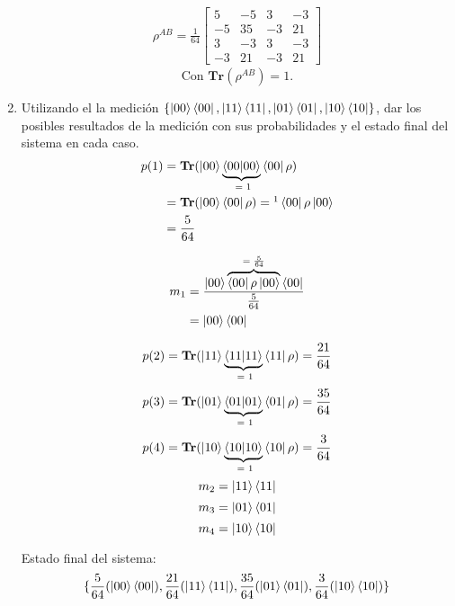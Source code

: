 \documentclass[a4paper]{article}
\begin{document}
\begin{enumerate}[label=(\alph*)]
\begin{align*}
\rho^{AB} = \frac{1}{64}
  \begin{bmatrix}
    5 & -5 & 3 & -3 \\
    -5 & 35 & -3 & 21 \\
    3 & -3 & 3 & -3 \\
    -3 & 21 & -3 & 21 
  \end{bmatrix}
\end{align*}
\[
\text{Con } \textbf{Tr}(\rho^{AB}) = 1.
\]
\newpage

\item{Utilizando el la medición $\{\ket{00}\bra{00}, \ket{11}\bra{11}, \ket{01}\bra{01}, \ket{10}\bra{10}\}$, dar los posibles resultados de la medición con sus probabilidades y el estado final del sistema en cada caso.}\\

\begin{align*}
p(1) &= \textbf{Tr}(\ket{00}\underbrace{\bra{00}\ket{00}}_{\text{ = 1}}\bra{00}\rho)\\
        &= \textbf{Tr}(\ket{00}\bra{00}\rho) =\footnotemark \bra{00} \rho \ket{00}\\
        &= \frac{5}{64}
\end{align*}

\begin{align*}
m_1 & = \frac{\ket{00}\overbrace{\bra{00} \rho \ket{00}}^{\text{$= \frac{5}{64}$}}\bra{00}}{\frac{5}{64}}\\
        & = \ket{00}\bra{00}
\end{align*}

\[
p(2) = \textbf{Tr}(\ket{11}\underbrace{\bra{11}\ket{11}}_{\text{ = 1}}\bra{11}\rho) = \frac{21}{64}
\]
\[
p(3) = \textbf{Tr}(\ket{01}\underbrace{\bra{01}\ket{01}}_{\text{ = 1}}\bra{01}\rho) = \frac{35}{64}
\]
\[
p(4) = \textbf{Tr}(\ket{10}\underbrace{\bra{10}\ket{10}}_{\text{ = 1}}\bra{10}\rho) = \frac{3}{64}
\]
\[
m_2 = \ket{11}\bra{11}
\]
\[
m_3 = \ket{01}\bra{01}
\]
\[
m_4 = \ket{10}\bra{10}
\]

Estado final del sistema: \\
\[
\{\frac{5}{64}(\ket{00}\bra{00}), \frac{21}{64}(\ket{11}\bra{11}), \frac{35}{64}(\ket{01}\bra{01}), \frac{3}{64}(\ket{10}\bra{10})\}
\]

\end{enumerate}
\newpage
\end{document}
